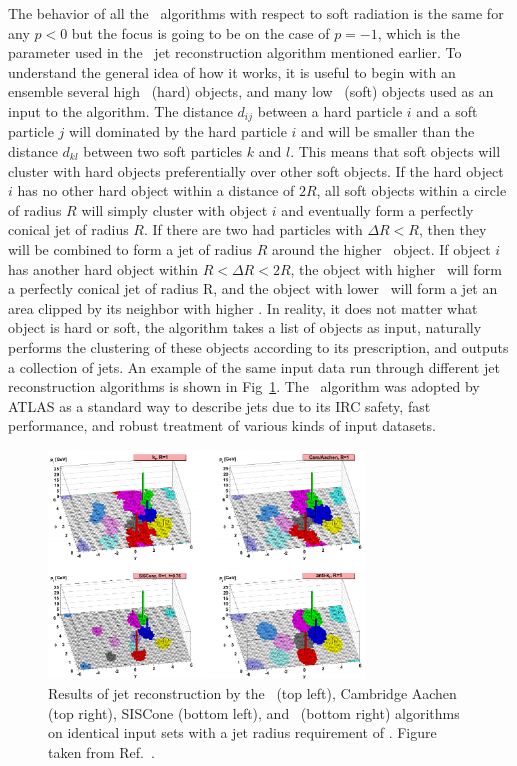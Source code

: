 The behavior of all the \kt\ algorithms with respect to soft radiation is the same for any $p < 0$ but the focus is going to be on the case of $p = -1$, which is the parameter used in the \antikt\ jet reconstruction algorithm mentioned earlier. To understand the general idea of how it works, it is useful to begin with an ensemble several high \pt\ (hard) objects, and many low \pt\ (soft) objects used as an input to the algorithm. The distance $d_{ij}$ between a hard particle $i$ and a soft particle $j$ will dominated by the hard particle $i$ and will be smaller than the distance $d_{kl}$ between two soft particles $k$ and $l$. This means that soft objects will cluster with hard objects preferentially over other soft objects. If the hard object $i$ has no other hard object within a distance of $2R$, all soft objects within a circle of radius $R$ will simply cluster with object $i$ and eventually form a perfectly conical jet of radius $R$. If there are two had particles with $\Delta R < R$, then they will be combined to form a jet of radius $R$ around the higher \pt\ object. If object $i$ has another hard object within $R < \Delta R < 2R$, the object with higher \pt\ will form a perfectly conical jet of radius R, and the object with lower \pt\ will form a jet an area clipped by its neighbor with higher \pt. In reality, it does not matter what object is hard or soft, the algorithm takes a list of objects as input, naturally performs the clustering of these objects according to its prescription, and outputs a collection of jets. An example of the same input data run through different jet reconstruction algorithms is shown in Fig~\ref{fig:jetalgos}. The \antikt\ algorithm was adopted by ATLAS as a standard way to describe jets due to its IRC safety, fast performance, and robust treatment of various kinds of input datasets. 

\begin{figure}
	\centering
	\includegraphics[width=0.75\textwidth]{figures/jetalgo.pdf} 
	\caption{ Results of jet reconstruction by the \kt\ (top left), Cambridge Aachen (top right), SISCone (bottom left), and \antikt\ (bottom right) algorithms on identical input sets with a jet radius requirement of \ROne. Figure taken from Ref.~\cite{Cacciari:2008qp}.}
	\label{fig:jetalgos}
\end{figure}

